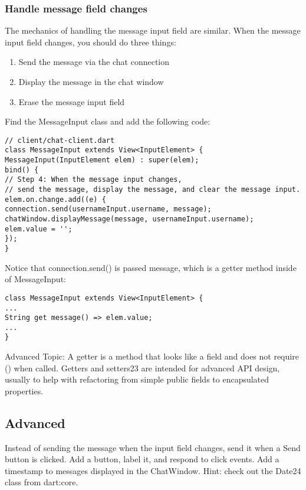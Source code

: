 \subsubsection{Handle message field changes}

The mechanics of handling the message input field are similar. When the message input field changes, you should do three things:

\begin{enumerate}
\item Send the message via the chat connection
\item Display the message in the chat window
\item Erase the message input field
\end{enumerate}

Find the MessageInput class and add the following code:

\begin{verbatim}
// client/chat-client.dart
class MessageInput extends View<InputElement> {
MessageInput(InputElement elem) : super(elem);
bind() {
// Step 4: When the message input changes,
// send the message, display the message, and clear the message input.
elem.on.change.add((e) {
connection.send(usernameInput.username, message);
chatWindow.displayMessage(message, usernameInput.username);
elem.value = '';
});
}
\end{verbatim}

Notice that connection.send() is passed message, which is a getter method inside of MessageInput:

\begin{verbatim}
class MessageInput extends View<InputElement> {
...
String get message() => elem.value;
...
}
\end{verbatim}

Advanced Topic: A getter is a method that looks like a field and does not require () when called. Getters and setters23 are intended for advanced API design, usually to help with refactoring from simple public fields to encapsulated properties.

\subsection{Advanced}

Instead of sending the message when the input field changes, send it when a Send button is clicked. Add a button, label it, and respond to click events.
Add a timestamp to messages displayed in the ChatWindow. Hint: check out the Date24 class from dart:core.


